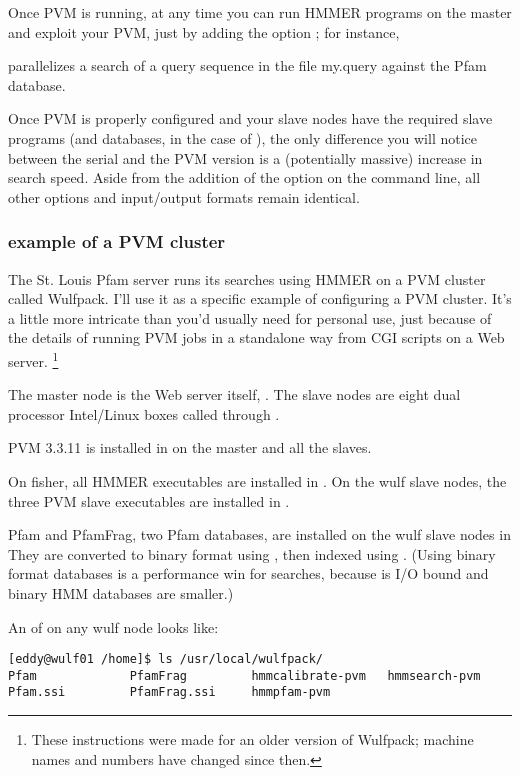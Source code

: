 Once PVM is running, at any time you can run HMMER programs on the
master and exploit your PVM, just by adding the option ;
for instance,


parallelizes a search of a query sequence in the file my.query against
the Pfam database.

Once PVM is properly configured and your slave nodes have the required
slave programs (and databases, in the case of ), the
only difference you will notice between the serial and the PVM version
is a (potentially massive) increase in search speed. Aside from the
addition of the  option on the command line, all other
options and input/output formats remain identical.

\subsubsection{example of a PVM cluster}

The St. Louis Pfam server runs its searches using HMMER on a PVM
cluster called Wulfpack. I'll use it as a specific example of
configuring a PVM cluster. It's a little more intricate than you'd
usually need for personal use, just because of the details of running
PVM jobs in a standalone way from CGI scripts on a Web server.
\footnote{These instructions were made for an older version of
Wulfpack; machine names and numbers have changed since then.}

The master node is the Web server itself, . The slave
nodes are eight dual processor Intel/Linux boxes called 
through . 

PVM 3.3.11 is installed in  on the master and
all the slaves.

On fisher, all HMMER executables are installed in
.  On the wulf slave nodes, the three PVM slave
executables are installed in .

Pfam and PfamFrag, two Pfam databases, are installed on the wulf slave
nodes in  They are converted to binary
format using , then indexed using .
(Using binary format databases is a performance win for 
searches, because  is I/O bound and binary HMM databases
are smaller.)

An  of  on any wulf node looks like:
\begin{verbatim}
[eddy@wulf01 /home]$ ls /usr/local/wulfpack/
Pfam             PfamFrag         hmmcalibrate-pvm   hmmsearch-pvm
Pfam.ssi         PfamFrag.ssi     hmmpfam-pvm
\end{verbatim}


